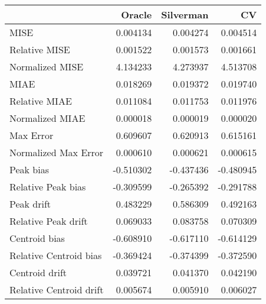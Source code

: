 \begin{tabular}{lrrr}
  \hline
 & Oracle & Silverman & CV \\ 
  \hline
MISE & 0.004134 & 0.004274 & 0.004514 \\ 
  Relative MISE & 0.001522 & 0.001573 & 0.001661 \\ 
  Normalized MISE & 4.134233 & 4.273937 & 4.513708 \\ 
  MIAE & 0.018269 & 0.019372 & 0.019740 \\ 
  Relative MIAE & 0.011084 & 0.011753 & 0.011976 \\ 
  Normalized MIAE & 0.000018 & 0.000019 & 0.000020 \\ 
  Max Error & 0.609607 & 0.620913 & 0.615161 \\ 
  Normalized Max Error & 0.000610 & 0.000621 & 0.000615 \\ 
  Peak bias & -0.510302 & -0.437436 & -0.480945 \\ 
  Relative Peak bias & -0.309599 & -0.265392 & -0.291788 \\ 
  Peak drift & 0.483229 & 0.586309 & 0.492163 \\ 
  Relative Peak drift & 0.069033 & 0.083758 & 0.070309 \\ 
  Centroid bias & -0.608910 & -0.617110 & -0.614129 \\ 
  Relative Centroid bias & -0.369424 & -0.374399 & -0.372590 \\ 
  Centroid drift & 0.039721 & 0.041370 & 0.042190 \\ 
  Relative Centroid drift & 0.005674 & 0.005910 & 0.006027 \\ 
   \hline
\end{tabular}
